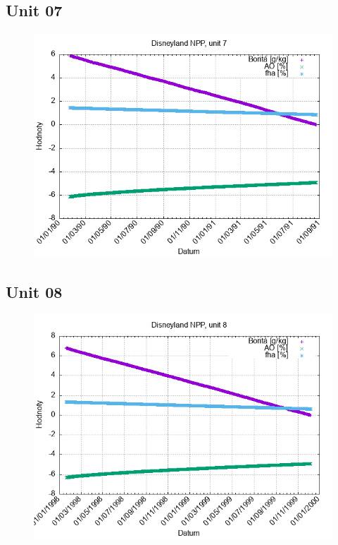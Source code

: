 \documentclass{article}
\begin{document}
\subsection*{Unit 07}
\begin{figure}[h!]
\centering
\includegraphics[width=14cm]{./grafy/Disneyland07.png}
\end{figure}
\clearpage
\subsection*{Unit 08}
\begin{figure}[h!]
\centering
\includegraphics[width=14cm]{./grafy/Disneyland08.png}
\end{figure}
\clearpage
\end{document}
